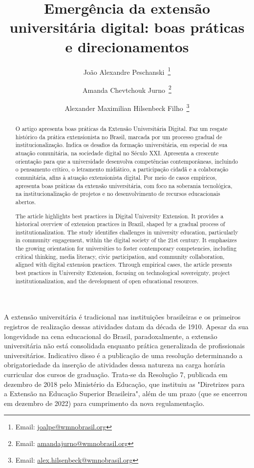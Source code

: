 \documentclass[portuguese]{textolivre}
\title{Emergência da extensão universitária digital: boas práticas e direcionamentos}
\author[1]{João Alexandre Peschanski~\orcid{0000-0002-2352-1787}\thanks{Email: \href{mailto:joalpe@wmnobrasil.org}{joalpe@wmnobrasil.org}}}
\author[1]{Amanda Chevtchouk Jurno~\orcid{0000-0002-2192-8161}\thanks{Email: \href{mailto:amandajurno@wmnobrasil.org}{amandajurno@wmnobrasil.org}}}
\author[1]{Alexander Maximilian Hilsenbeck Filho~\orcid{0009-0000-5325-3325}\thanks{Email: \href{mailto:alex.hilsenbeck@wmnobrasil.org}{alex.hilsenbeck@wmnobrasil.org}}}
\affil[1]{Wiki Movimento Brasil, São Paulo, SP, Brasil.}
\begin{document}
\maketitle
\begin{polyabstract}
\begin{abstract}
O artigo apresenta boas práticas da Extensão
Universitária Digital. Faz um resgate histórico da prática extensionista
no Brasil, marcada por um processo gradual de institucionalização.
Indica os desafios da formação universitária, em especial de sua atuação
comunitária, na sociedade digital no Século XXI. Apresenta a crescente
orientação para que a universidade desenvolva competências
contemporâneas, incluindo o pensamento crítico, o letramento midiático,
a participação cidadã e a colaboração comunitária, afins à atuação
extensionista digital. Por meio de casos empíricos, apresenta boas
práticas da extensão universitária, com foco na soberania tecnológica,
na institucionalização de projetos e no desenvolvimento de recursos
educacionais abertos.

\end{abstract}

\begin{english}
\begin{abstract}
The article highlights best practices in Digital
University Extension. It provides a historical overview of extension
practices in Brazil, shaped by a gradual process of
institutionalization. The study identifies challenges in university
education, particularly in community engagement, within the digital
society of the 21st century. It emphasizes the growing orientation for
universities to foster contemporary competencies, including critical
thinking, media literacy, civic participation, and community
collaboration, aligned with digital extension practices. Through
empirical cases, the article presents best practices in University
Extension, focusing on technological sovereignty, project
institutionalization, and the development of open educational resources.

\end{abstract}
\end{english}
\end{polyabstract}


A extensão universitária é tradicional nas instituições brasileiras e os
primeiros registros de realização dessas atividades datam da década de
1910. Apesar da sua longevidade na cena educacional do Brasil,
paradoxalmente, a extensão universitária não está consolidada enquanto
prática generalizada de profissionais universitários. Indicativo disso é
a publicação de uma resolução determinando a obrigatoriedade da inserção
de atividades dessa natureza na carga horária curricular dos cursos de
graduação. Trata-se da Resolução 7, publicada em dezembro de 2018 pelo
Ministério da Educação, que instituiu as "Diretrizes para a Extensão na
Educação Superior Brasileira", além de um prazo (que se encerrou em
dezembro de 2022) para cumprimento da nova regulamentação.
\end{document}
